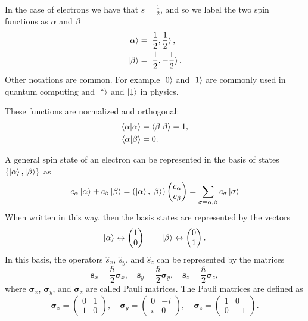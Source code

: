 \documentclass[../Main/chem532-notes.tex]{subfiles}
\begin{document}
In the case of electrons we have that $s = \frac{1}{2}$, and so we label the two spin functions as $\alpha$ and $\beta$
\begin{align}
\ket{\alpha} &= \ket{\frac{1}{2},\frac{1}{2}}, \\
\ket{\beta} &= \ket{\frac{1}{2},-\frac{1}{2}}.
\end{align}
Other notations are common. For example $\ket{0}$ and $\ket{1}$ are commonly used in quantum computing and $\ket{\uparrow}$ and $\ket{\downarrow}$ in physics.

These functions are normalized and orthogonal:
\begin{align}
\braket{\alpha | \alpha} &= \braket{\beta | \beta} = 1, \\
\braket{\alpha | \beta} &= 0. \label{eq:spin_orthogonality}
\end{align}

A general spin state of an electron can be represented in the basis of states $\{ \ket{\alpha}, \ket{\beta} \}$ as
\begin{equation}
c_\alpha \ket{\alpha} + c_\beta \ket{\beta} = ( \ket{\alpha}, \ket{\beta})
\begin{pmatrix}
c_\alpha \\
c_\beta
\end{pmatrix}
= \sum_{\sigma = \alpha, \beta} c_\sigma \ket{\sigma}
\end{equation}
When written in this way, then the basis states are represented by the vectors
\begin{equation}
\ket{\alpha} \leftrightarrow 
\begin{pmatrix}
1 \\
0
\end{pmatrix}
\quad \quad
\ket{\beta} \leftrightarrow 
\begin{pmatrix}
0 \\
1
\end{pmatrix}.
\end{equation}
In this basis, the operators $\hat{s}_x$, $\hat{s}_y$, and $\hat{s}_z$ can be represented by the matrices
\begin{equation}
\mathbf{s}_x = \frac{\hbar}{2} \boldsymbol{\sigma}_x, \quad
\mathbf{s}_y = \frac{\hbar}{2} \boldsymbol{\sigma}_y, \quad
\mathbf{s}_z = \frac{\hbar}{2} \boldsymbol{\sigma}_z,
\end{equation}
where $\boldsymbol{\sigma}_x$, $\boldsymbol{\sigma}_y$, and $\boldsymbol{\sigma}_z$ are called Pauli matrices.
The Pauli matrices are defined as
\begin{equation}
\boldsymbol{\sigma}_x = 
\begin{pmatrix}
0 & 1 \\
1 & 0
\end{pmatrix}, \quad
\boldsymbol{\sigma}_y = 
\begin{pmatrix}
0 & -i \\
i & 0
\end{pmatrix}, \quad
\boldsymbol{\sigma}_z = 
\begin{pmatrix}
1 & 0 \\
0 & -1
\end{pmatrix}.
\end{equation}
\end{document}
